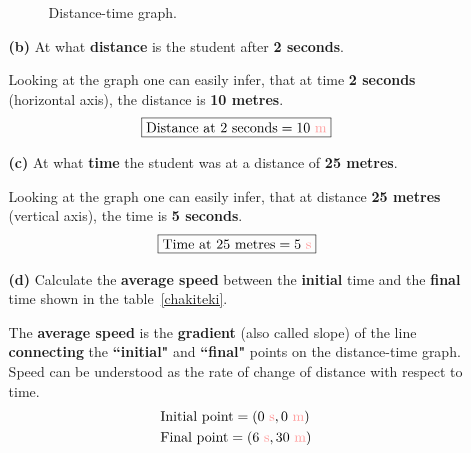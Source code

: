 \documentclass[A4,12pt]{article}
\begin{document}
\begin{enumerate}[label=\bfseries (\arabic*)]
\begin{itemize}
\begin{example}
\begin{figure}[H]
    \caption{Distance-time graph.}
    \label{fig:my_label}
    \end{figure}
    \end{example}
    \item[\bf (b)] At what \textbf{distance} is the student after \textbf{2 seconds}.
    \begin{example}
    Looking at the graph one can easily infer, that at time \textbf{2 seconds} (horizontal axis), the distance is \textbf{10 metres}. %
    \begin{equation*}
        \boxed{\text{Distance at 2 seconds}=\msis{10}}
    \end{equation*}
    \end{example}
    \item[\bf (c)] At what \textbf{time} the student was at a distance of \textbf{25 metres}.
    \begin{example}
    Looking at the graph one can easily infer, that at distance \textbf{25 metres} (vertical axis), the time is \textbf{5 seconds}.%
    \begin{equation*}
        \boxed{\text{Time at 25 metres}=\tsis{5}}
    \end{equation*}
    \end{example}
    \item[\bf (d)] Calculate the \textbf{average speed} between the \textbf{initial} time and the \textbf{final} time shown in the table~\ref{chakiteki}.
    \begin{example}
    The \textbf{average speed} is the \textbf{gradient} (also called slope) of the line \textbf{connecting} the \textbf{``initial"} and \textbf{``final"} points on the distance-time graph. Speed can be understood as the rate of change of distance with respect to time.
    \begin{equation*}
        \begin{split}
            &\text{Initial point}=(\tsis{0},\msis{0})\\
            &\text{Final point}=(\tsis{6},\msis{30})\\
        \end{split}
    \end{equation*}
    \begin{equation*}

\end{equation*}
\end{example}
\end{itemize}
\end{enumerate}
\end{document}
